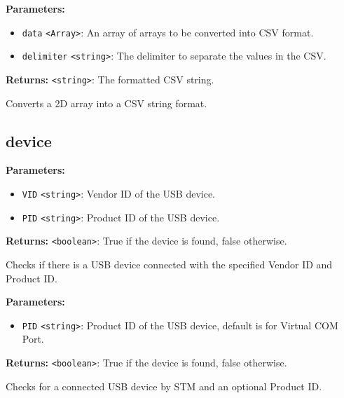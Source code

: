 \documentclass[12pt,a4paper]{article}
\begin{document}
\noindent \textbf{Parameters:}
\begin{itemize}
  \item \texttt{data} \texttt{<Array>}: An array of arrays to be converted into CSV format.
  \item \texttt{delimiter} \texttt{<string>}: The delimiter to separate the values in the CSV.
\end{itemize}

\noindent \textbf{Returns:} \texttt{<string>}: The formatted CSV string.

\noindent Converts a 2D array into a CSV string format.


\subsection{device}
\vspace{5mm}
\noindent {}


\noindent \textbf{Parameters:}
\begin{itemize}
  \item \texttt{VID} \texttt{<string>}: Vendor ID of the USB device.
  \item \texttt{PID} \texttt{<string>}: Product ID of the USB device.
\end{itemize}

\noindent \textbf{Returns:} \texttt{<boolean>}: True if the device is found, false otherwise.

\noindent Checks if there is a USB device connected with the specified Vendor ID and Product ID.

\vspace{5mm}
\noindent {}


\noindent \textbf{Parameters:}
\begin{itemize}
  \item \texttt{PID} \texttt{<string>}: Product ID of the USB device, default is for Virtual COM Port.
\end{itemize}

\noindent \textbf{Returns:} \texttt{<boolean>}: True if the device is found, false otherwise.

\noindent Checks for a connected USB device by STM and an optional Product ID.
\end{document}
